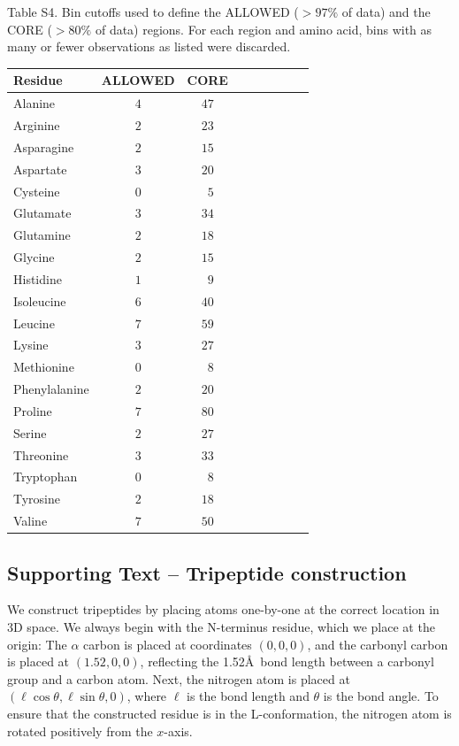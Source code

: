 \documentclass[12pt]{article}
\begin{document}
\newpage
\bigskip

\noindent Table S4. Bin cutoffs used to define the ALLOWED ($>97\%$ of data) and the CORE ($>80\%$ of data) regions. For each region and amino acid, bins with as many or fewer observations as listed were discarded.

\begin{center}
\begin{tabular}{lcccccccc}
Residue & ALLOWED & CORE \\
\hline Alanine   & $4$ & $47$ \\
Arginine         & $2$ & $23$ \\
Asparagine       & $2$ & $15$ \\
Aspartate        & $3$ & $20$ \\
Cysteine         & $0$ & $\phantom{0}5$ \\
Glutamate        & $3$ & $34$ \\
Glutamine        & $2$ & $18$ \\
Glycine          & $2$ & $15$ \\
Histidine        & $1$ & $\phantom{0}9$ \\
Isoleucine       & $6$ & $40$ \\
Leucine          & $7$ & $59$ \\
Lysine           & $3$ & $27$ \\
Methionine       & $0$ & $\phantom{0}8$ \\
Phenylalanine    & $2$ & $20$ \\
Proline          & $7$ & $80$ \\
Serine           & $2$ & $27$ \\
Threonine        & $3$ & $33$ \\
Tryptophan       & $0$ & $\phantom{0}8$ \\
Tyrosine         & $2$ & $18$ \\
Valine           & $7$ & $50$ \\
\hline
\end{tabular}
\end{center}

\newpage
\subsection*{Supporting Text -- Tripeptide construction}

We construct tripeptides by placing atoms one-by-one at the correct location in 3D space. We always begin with the N-terminus residue, which we place at the origin: The $\alpha$ carbon is placed at coordinates $(0,0,0)$, and the carbonyl carbon is placed at $(1.52, 0, 0)$, reflecting the 1.52\AA\ bond length between a carbonyl group and a carbon atom. Next, the nitrogen atom is placed at $(\ell \cos{\theta}, \ell \sin{\theta}, 0)$, where $\ell$ is the bond length and $\theta$ is the bond angle. To ensure that the constructed residue is in the L-conformation, the nitrogen atom is rotated positively from the $x$-axis. 
\end{document}
